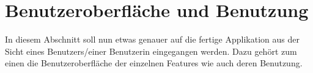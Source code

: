 \documentclass[../main.tex]{subfiles}
\begin{document}
\section{Benutzeroberfläche und Benutzung}%
In diesem Abschnitt soll nun etwas genauer auf die fertige Applikation aus der Sicht eines Benutzers/einer Benutzerin eingegangen werden. Dazu gehört zum einen die Benutzeroberfläche der einzelnen Features wie auch deren Benutzung.
\end{document}
